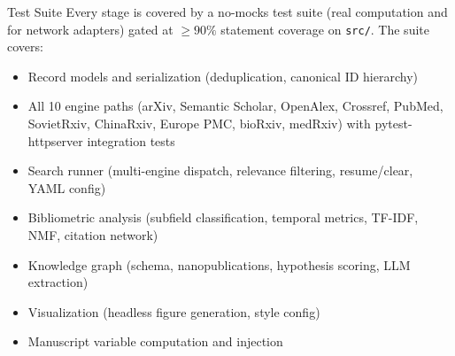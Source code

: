 \documentclass[
  ignorenonframetext,
]{beamer}
\providecommand{\tightlist}{%
  \setlength{\itemsep}{0pt}\setlength{\parskip}{0pt}}
\begin{document}
\begin{frame}{Test Suite}
\protect{}\label{test-suite}
Every stage is covered by a no-mocks test suite (real computation and
 for network adapters) gated at \(\geq 90\%\)
statement coverage on \texttt{src/}. The suite covers:

\begin{itemize}
\tightlist
\item
  Record models and serialization (deduplication, canonical ID
  hierarchy)
\item
  All 10 engine paths (arXiv, Semantic Scholar, OpenAlex, Crossref,
  PubMed, SovietRxiv, ChinaRxiv, Europe PMC, bioRxiv, medRxiv) with
  pytest-httpserver integration tests
\item
  Search runner (multi-engine dispatch, relevance filtering,
  resume/clear, YAML config)
\item
  Bibliometric analysis (subfield classification, temporal metrics,
  TF-IDF, NMF, citation network)
\item
  Knowledge graph (schema, nanopublications, hypothesis scoring, LLM
  extraction)
\item
  Visualization (headless figure generation, style config)
\item
  Manuscript variable computation and injection
\end{itemize}
\end{frame}
\end{document}

